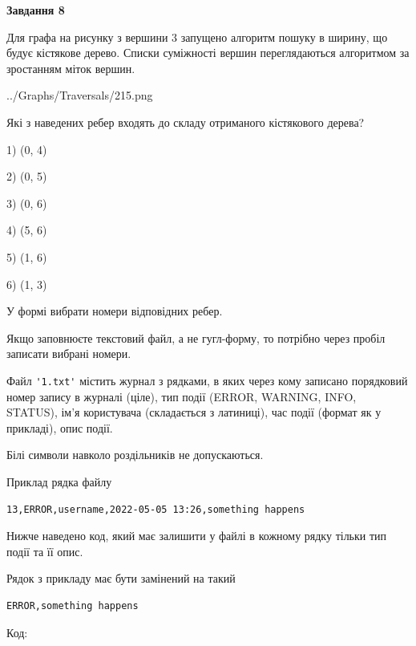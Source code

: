 \documentclass[12pt, ukrainian]{article}
\def\code#1{\Verb!#1!}
\begin{document}
{\begin {large}
{\begin {center}\textbf{Завдання 8}\end {center}}\par
Для графа на рисунку з вершини 3 запущено алгоритм пошуку в ширину, що будує кістякове дерево. Списки суміжності вершин переглядаються алгоритмом за зростанням міток вершин.\par
\begin{center}
	{../Graphs/Traversals/215.png}
\end{center}
\par Які з наведених ребер входять до складу отриманого кістякового дерева?\par
1) (0, 4)\par
2) (0, 5)\par
3) (0, 6)\par
4) (5, 6)\par
5) (1, 6)\par
6) (1, 3)\par
{\vskip 15pt} У формі вибрати номери відповідних ребер.


Якщо заповнюєте текстовий файл, а не гугл-форму, то потрібно через пробіл записа\-ти вибрані номери.\par
\newpage


Файл \code{'1.txt'} містить журнал з рядками, в яких через кому записано поряд\-ко\-вий номер запису в журналі (ціле), тип події (ERROR, WARNING, INFO, STATUS), ім'я користувача (складається з латиниці), час події (фор\-мат як у прикладі), опис події.

Білі символи навколо роздільників не допускаються.

Приклад рядка файлу



\begin{verbatim}
13,ERROR,username,2022-05-05 13:26,something happens
\end{verbatim}


Нижче наведено код, який має залишити у файлі в кожному рядку тільки тип події та її опис.

Рядок з прикладу має бути замінений на такий



\begin{verbatim}
ERROR,something happens
\end{verbatim}




Код:




\end{large}}
\end{document}
